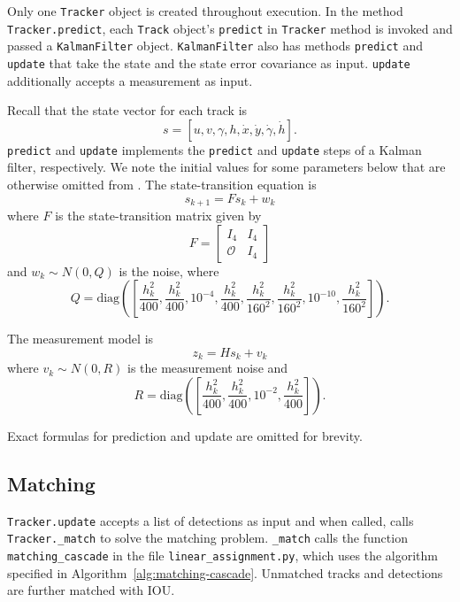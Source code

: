 \documentclass[conference]{IEEEtran}
\begin{document}
Only one \texttt{Tracker} object is created throughout execution. In the method \texttt{Tracker.predict}, each \texttt{Track} object's \texttt{predict} in \texttt{Tracker} method is invoked and passed a \texttt{KalmanFilter} object. \texttt{KalmanFilter} also has methods \texttt{predict} and \texttt{update} that take the state and the state error covariance as input. \texttt{update} additionally accepts a measurement as input.

Recall that the state vector for each track is
\[
    s = [u, v, \gamma, h, \dot{x}, \dot{y}, \dot{\gamma}, \dot{h}].
\]
\texttt{predict} and \texttt{update} implements the \texttt{predict} and \texttt{update} steps of a Kalman filter, respectively. We note the initial values for some parameters below that are otherwise omitted from \cite{Wojke2018deep}. The state-transition equation is
\[
    s_{k + 1} = Fs_k + w_k
\]
where $F$ is the state-transition matrix given by
\[
    F = \begin{bmatrix}
        I_4 & I_4\\
        \mathcal{O} & I_4
    \end{bmatrix}
\]
and $w_k \sim N(0, Q)$ is the noise, where
\[
    Q = \mathrm{diag}([\frac{h_k^2}{400}, \frac{h_k^2}{400}, 10^{-4}, \frac{h_k^2}{400}, \frac{h_k^2}{160^2}, \frac{h_k^2}{160^2}, 10^{-10}, \frac{h_k^2}{160^2}]).
\]

The measurement model is
\[
    z_k = Hs_k + v_k
\]
where $v_k \sim N(0, R)$ is the measurement noise and
\[
    R = \mathrm{diag}([\frac{h_k^2}{400}, \frac{h_k^2}{400}, 10^{-2}, \frac{h_k^2}{400}]).
\]

Exact formulas for prediction and update are omitted for brevity.

\subsection{Matching}

\texttt{Tracker.update} accepts a list of detections as input and when called, calls \texttt{Tracker.\_match} to solve the matching problem. \texttt{\_match} calls the function \texttt{matching\_cascade} in the file \texttt{linear\_assignment.py}, which uses the algorithm specified in Algorithm~\ref{alg:matching-cascade}. Unmatched tracks and detections are further matched with IOU.
\end{document}
